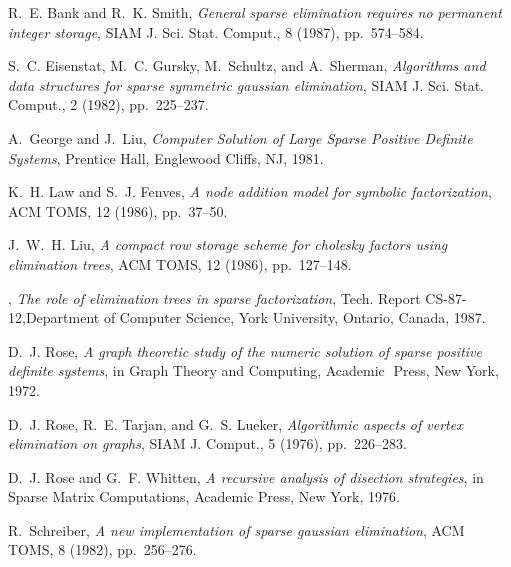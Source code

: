 \begin{thebibliography}{99}


R.~E. Bank and R.~K. Smith, {\em General sparse elimination requires no
  permanent integer storage}, SIAM J. Sci. Stat. Comput., 8 (1987),
  pp.~574--584.

S.~C. Eisenstat, M.~C. Gursky, M.~Schultz, and A.~Sherman, {\em
  Algorithms and data structures for sparse symmetric gaussian elimination},
  SIAM J. Sci. Stat. Comput., 2 (1982), pp.~225--237.

A.~George and J.~Liu, {\em Computer Solution of Large Sparse Positive
  Definite Systems}, Prentice Hall, Englewood Cliffs, NJ, 1981.

K.~H. Law and S.~J. Fenves, {\em A node addition model for symbolic
  factorization}, ACM TOMS, 12 (1986), pp.~37--50.

J.~W.~H. Liu, {\em A compact row storage scheme for cholesky factors
  using elimination trees}, ACM TOMS, 12 (1986), pp.~127--148.

\sameauthor , {\em The role of
  elimination trees in sparse factorization}, Tech. Report CS-87-12,Department
  of Computer Science, York University, Ontario, Canada, 1987.

D.~J. Rose, {\em A graph theoretic study of the numeric solution of
  sparse positive definite systems}, in Graph Theory and Computing, Academic  Press, New
York, 1972.

D.~J. Rose, R.~E. Tarjan, and G.~S. Lueker, {\em Algorithmic aspects of
  vertex elimination on graphs}, SIAM J. Comput., 5 (1976), pp.~226--283.

D.~J. Rose and G.~F. Whitten, {\em A recursive analysis of disection
  strategies}, in Sparse Matrix Computations, Academic Press, New York, 1976.

R.~Schreiber, {\em A new implementation of sparse gaussian elimination},
  ACM TOMS, 8 (1982), pp.~256--276.

\end{thebibliography}


